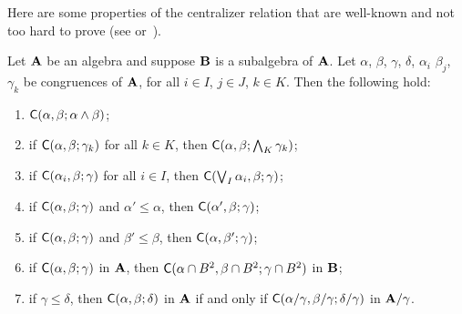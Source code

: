 


Here are some properties of the centralizer relation
that are well-known and not too hard to prove
(see \cite[Prop~3.4]{HM:1988} or~\cite[Thm~2.19]{MR3076179}).
\begin{lem}
\label{lem:centralizers}
Let $\mathbf{A}$ be an algebra and suppose
$\mathbf{B}$ is a subalgebra of $\mathbf{A}$.
Let $\alpha$, $\beta$, $\gamma$, $\delta$, $\alpha_i$
$\beta_j$, $\gamma_k$
be congruences of $\mathbf{A}$, for all
$i \in I$, $j\in J$, $k \in K$. Then the following hold:
\begin{enumerate}
\item \label{centralizing_over_meet}
  $\mathsf{C}(\alpha, \beta; \alpha \wedge \beta)$;
\item \label{centralizing_over_meet2}
  if $\mathsf{C}(\alpha,  \beta;  \gamma_k)$ for all $k \in K$, then
  $\mathsf{C}(\alpha,  \beta;  \bigwedge_{K}\gamma_k)$;
\item \label{centralizing_over_join1}
  if $\mathsf{C}(\alpha_i,  \beta;  \gamma)$ for all $i\in I$, then
  $\mathsf{C}(\bigvee_{I}\alpha_i,  \beta; \gamma)$;
\item \label{monotone_centralizers1}
  if $\mathsf{C}(\alpha,  \beta;  \gamma)$ and $\alpha' \leq \alpha$, then
  $\mathsf{C}(\alpha',  \beta;  \gamma)$;
\item \label{monotone_centralizers2}
  if $\mathsf{C}(\alpha,  \beta;  \gamma)$ and $\beta' \leq \beta$, then
  $\mathsf{C}(\alpha,  \beta';  \gamma)$;
\item \label{centralizing_over_subalg}
  if $\mathsf{C}(\alpha,  \beta;  \gamma)$ in $\mathbf{A}$,
  then $\mathsf{C}(\alpha\cap B^2,  \beta\cap B^2; \gamma\cap B^2)$ in $\mathbf{B}$;
\item \label{centralizing_factors}
  if $\gamma \leq \delta$, then $\mathsf{C}(\alpha,  \beta;  \delta)$
  in $\mathbf{A}$ if and only if $\mathsf{C}(\alpha/\gamma,  \beta/\gamma;  \delta/\gamma)$
  in $\mathbf{A}/\gamma$.
\end{enumerate}
\end{lem}


